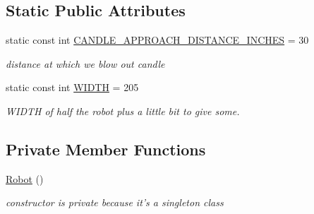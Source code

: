 \subsection*{Static Public Attributes}
\begin{DoxyCompactItemize}
\item 
static const int \hyperlink{classRobot_a59c0d01f9863b7c1e504b558bd9fae67}{C\-A\-N\-D\-L\-E\-\_\-\-A\-P\-P\-R\-O\-A\-C\-H\-\_\-\-D\-I\-S\-T\-A\-N\-C\-E\-\_\-\-I\-N\-C\-H\-E\-S} = 30
\begin{DoxyCompactList}\small\item\em distance at which we blow out candle \end{DoxyCompactList}\item 
static const int \hyperlink{classRobot_aeefc61d76e6ba024e4af9c844715a84d}{W\-I\-D\-T\-H} = 205
\begin{DoxyCompactList}\small\item\em W\-I\-D\-T\-H of half the robot plus a little bit to give some. \end{DoxyCompactList}\end{DoxyCompactItemize}
\subsection*{Private Member Functions}
\begin{DoxyCompactItemize}
\item 
\hyperlink{classRobot_a4fc7c70ae20623f05e06f2ecb388b6c4}{Robot} ()
\begin{DoxyCompactList}\small\item\em constructor is private because it's a singleton class \end{DoxyCompactList}\end{DoxyCompactItemize}
